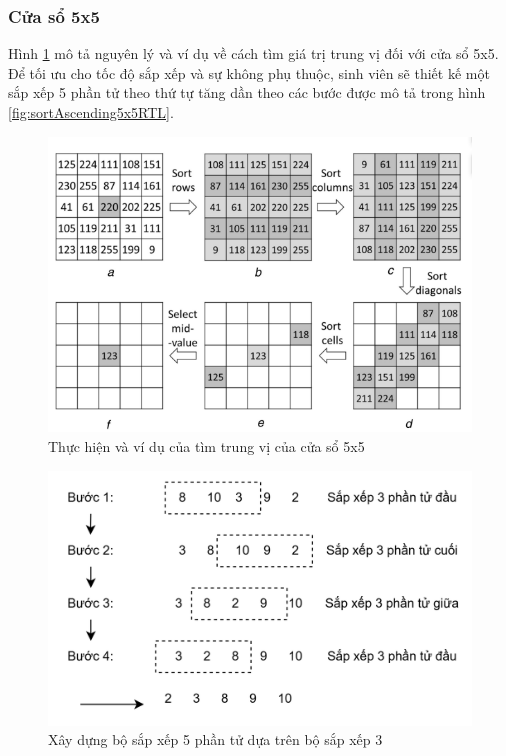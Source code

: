 \subsubsection{Cửa sổ 5x5}

Hình \ref{fig:median5x5Example} mô tả nguyên lý và ví dụ về cách tìm giá trị trung vị đối với cửa sổ 5x5. Để tối ưu cho tốc độ sắp xếp và sự không phụ thuộc, sinh viên sẽ thiết kế một sắp xếp 5 phần tử theo thứ tự tăng dần theo các bước được mô tả trong hình \ref{fig:sortAscending5x5RTL}.

\begin{figure}[!ht]
	\centering
	\includegraphics[width=0.8\linewidth]{figures/median5x5Example.png}
	\caption{Thực hiện và ví dụ của tìm trung vị của cửa sổ 5x5 \cite{llmf}}
	\label{fig:median5x5Example}
\end{figure}

\begin{figure}[!ht]
	\centering
	\includegraphics[width=0.8\linewidth]{figures/sortAscending5x5Ex.png}
	\caption{Xây dựng bộ sắp xếp 5 phần tử dựa trên bộ sắp xếp 3}
	\label{fig:sortAscending5x5Ex}
\end{figure}

